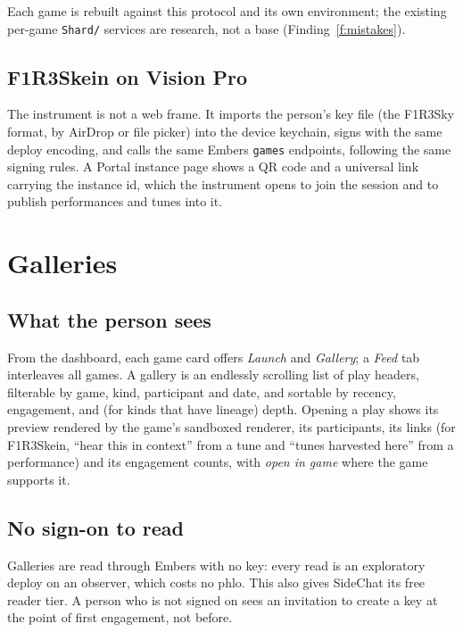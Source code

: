 \documentclass[11pt]{article}
\theoremstyle{definition}
\theoremstyle{remark}
\newcommand{\code}[1]{\texttt{#1}}
\newcommand{\Em}{Embers}
\newcommand{\Sky}{F1R3Sky}
\begin{document}
Each game is rebuilt against this protocol and its own environment; the existing
per-game \code{Shard/} services are research, not a base (Finding~\ref{f:mistakes}).

\subsection{F1R3Skein on Vision Pro}

The instrument is not a web frame. It imports the person's key file (the \Sky{}
format, by AirDrop or file picker) into the device keychain, signs with the same
deploy encoding, and calls the same \Em{} \code{games} endpoints, following the same
signing rules. A Portal instance page shows a QR code and a universal link carrying
the instance id, which the instrument opens to join the session and to publish
performances and tunes into it.

\section{Galleries}\label{sec:gallery}

\subsection{What the person sees}

From the dashboard, each game card offers \emph{Launch} and \emph{Gallery}; a
\emph{Feed} tab interleaves all games. A gallery is an endlessly scrolling list of
play headers, filterable by game, kind, participant and date, and sortable by
recency, engagement, and (for kinds that have lineage) depth. Opening a play shows
its preview rendered by the game's sandboxed renderer, its participants, its links
(for F1R3Skein, ``hear this in context'' from a tune and ``tunes harvested here''
from a performance) and its engagement counts, with \emph{open in game} where the
game supports it.

\subsection{No sign-on to read}

Galleries are read through \Em{} with no key: every read is an exploratory deploy on
an observer, which costs no phlo. This also gives SideChat its free reader tier. A
person who is not signed on sees an invitation to create a key at the point of first
engagement, not before.
\end{document}

